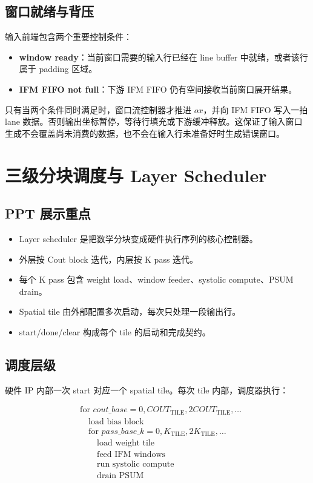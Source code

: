 \documentclass[fontset=fandol,ugly,language=chinese]{pkuthss}
\newcommand{\KTILE}{K_{\mathrm{TILE}}}
\newcommand{\COUTTILE}{COUT_{\mathrm{TILE}}}
\begin{document}
\section{窗口就绪与背压}

输入前端包含两个重要控制条件：

\begin{itemize}
    \item \textbf{window ready}：当前窗口需要的输入行已经在 line buffer 中就绪，或者该行属于 padding 区域。
    \item \textbf{IFM FIFO not full}：下游 IFM FIFO 仍有空间接收当前窗口展开结果。
\end{itemize}

只有当两个条件同时满足时，窗口流控制器才推进 $ox$，并向 IFM FIFO 写入一拍 lane 数据。否则输出坐标暂停，等待行填充或下游缓冲释放。这保证了输入窗口生成不会覆盖尚未消费的数据，也不会在输入行未准备好时生成错误窗口。

\chapter{三级分块调度与 Layer Scheduler}

\section{PPT 展示重点}

\begin{itemize}
    \item Layer scheduler 是把数学分块变成硬件执行序列的核心控制器。
    \item 外层按 Cout block 迭代，内层按 K pass 迭代。
    \item 每个 K pass 包含 weight load、window feeder、systolic compute、PSUM drain。
    \item Spatial tile 由外部配置多次启动，每次只处理一段输出行。
    \item start/done/clear 构成每个 tile 的启动和完成契约。
\end{itemize}

\section{调度层级}

硬件 IP 内部一次 start 对应一个 spatial tile。每次 tile 内部，调度器执行：

\begin{equation}
\begin{aligned}
&\text{for } cout\_base = 0,\COUTTILE,2\COUTTILE,\dots\\
&\quad \text{load bias block}\\
&\quad \text{for } pass\_base\_k = 0,\KTILE,2\KTILE,\dots\\
&\quad\quad \text{load weight tile}\\
&\quad\quad \text{feed IFM windows}\\
&\quad\quad \text{run systolic compute}\\
&\quad\quad \text{drain PSUM}
\end{aligned}
\end{equation}
\end{document}
